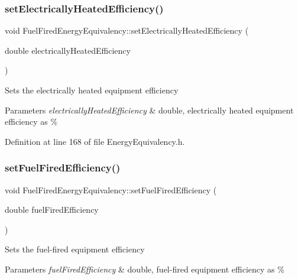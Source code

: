 \subsubsection{\texorpdfstring{set\+Electrically\+Heated\+Efficiency()}{setElectricallyHeatedEfficiency()}\hspace{0.1cm}{\footnotesize\ttfamily [3/3]}}
{\footnotesize\ttfamily void Fuel\+Fired\+Energy\+Equivalency\+::set\+Electrically\+Heated\+Efficiency (\begin{DoxyParamCaption}\item[{double}]{electrically\+Heated\+Efficiency }\end{DoxyParamCaption})\hspace{0.3cm}{\ttfamily [inline]}}

Sets the electrically heated equipment efficiency


\begin{DoxyParams}{Parameters}
{\em electrically\+Heated\+Efficiency} & double, electrically heated equipment efficiency as \% \\
\hline
\end{DoxyParams}


Definition at line 168 of file Energy\+Equivalency.\+h.

\mbox{\label{class_fuel_fired_energy_equivalency_a510b4a7c1231faeeebca02fa0b1723ae}} 
\subsubsection{\texorpdfstring{set\+Fuel\+Fired\+Efficiency()}{setFuelFiredEfficiency()}\hspace{0.1cm}{\footnotesize\ttfamily [1/3]}}
{\footnotesize\ttfamily void Fuel\+Fired\+Energy\+Equivalency\+::set\+Fuel\+Fired\+Efficiency (\begin{DoxyParamCaption}\item[{double}]{fuel\+Fired\+Efficiency }\end{DoxyParamCaption})\hspace{0.3cm}{\ttfamily [inline]}}

Sets the fuel-\/fired equipment efficiency


\begin{DoxyParams}{Parameters}
{\em fuel\+Fired\+Efficiency} & double, fuel-\/fired equipment efficiency as \% \\
\hline
\end{DoxyParams}


